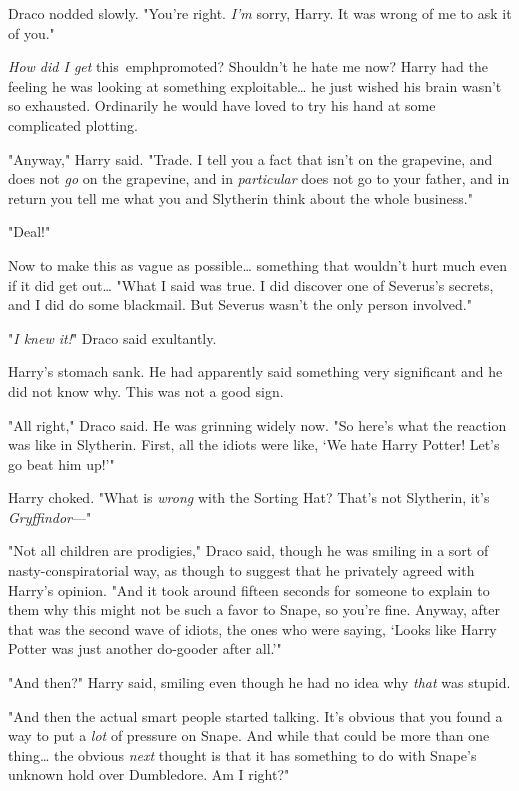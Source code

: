 Draco nodded slowly. "You're right. \emph{I'm} sorry, Harry. It was wrong of me 
to ask it of you."

\emph{How did I get} this\ emph{promoted? Shouldn't he hate me now?} Harry had 
the feeling he was looking at something exploitable{\ldots} he just wished his 
brain wasn't so exhausted. Ordinarily he would have loved to try his hand at 
some complicated plotting.

"Anyway," Harry said. "Trade. I tell you a fact that isn't on the grapevine, 
and does not \emph{go} on the grapevine, and in \emph{particular} does not go 
to your father, and in return you tell me what you and Slytherin think about 
the whole business."

"Deal!"

Now to make this as vague as possible{\ldots} something that wouldn't hurt much 
even if it did get out{\ldots} "What I said was true. I did discover one of 
Severus's secrets, and I did do some blackmail. But Severus wasn't the only 
person involved."

"\emph{I knew it!}" Draco said exultantly.

Harry's stomach sank. He had apparently said something very significant and he 
did not know why. This was not a good sign.

"All right," Draco said. He was grinning widely now. "So here's what the 
reaction was like in Slytherin. First, all the idiots were like, `We hate Harry 
Potter! Let's go beat him up!'"

Harry choked. "What is \emph{wrong} with the Sorting Hat? That's not Slytherin, 
it's \emph{Gryffindor}---"

"Not all children are prodigies," Draco said, though he was smiling in a sort 
of nasty-conspiratorial way, as though to suggest that he privately agreed with 
Harry's opinion. "And it took around fifteen seconds for someone to explain to 
them why this might not be such a favor to Snape, so you're fine. Anyway, after 
that was the second wave of idiots, the ones who were saying, `Looks like Harry 
Potter was just another do-gooder after all.'"

"And then?" Harry said, smiling even though he had no idea why \emph{that} was 
stupid.

"And then the actual smart people started talking. It's obvious that you found 
a way to put a \emph{lot} of pressure on Snape. And while that could be more 
than one thing{\ldots} the obvious \emph{next} thought is that it has something 
to do with Snape's unknown hold over Dumbledore. Am I right?"

